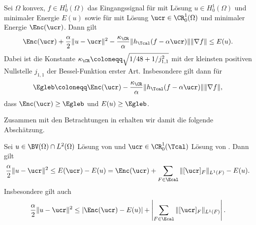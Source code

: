 
\begin{theorem}
  \label{thm:gueb}
  Sei $\Omega$ konvex, $f\in H^1_0(\Omega)$ das Eingangssignal für
   mit Lösung $u\in H^1_0(\Omega)$ und minimaler
  Energie $E(u)$ sowie für  mit Lösung $\ucr\in
  \CR^1_0(\Omega)$ und minimaler Energie $\Enc(\ucr)$.
  Dann gilt
  \begin{align*}
    \Enc(\ucr)+\frac{\alpha}{2}\Vert u-\ucr\Vert^2
    -\frac{\kappa_\CR}{\alpha}\Vert
    h_\Tcal(f-\alpha\ucr)\Vert \Vert\nabla f\Vert\leq E(u).
  \end{align*}
  Dabei ist die Konstante $\kappa_\CR\coloneqq\sqrt{1/48+1/j_{1,1}^2}$ mit der
  kleinsten positiven Nullstelle $j_{1,1}$ der Bessel-Funktion erster Art.
  Insbesondere gilt dann für 
  \begin{align}
    \Egleb 
    \coloneqq 
    \Enc(\ucr) - \frac{\kappa_\CR}{\alpha}\Vert h_\Tcal(f-\alpha\ucr)\Vert
    \Vert \nabla f\Vert,
  \end{align}
    dass $\Enc(\ucr)\geq \Egleb$ und $E(u)\geq \Egleb$.

\end{theorem}

Zusammen mit den Betrachtungen in  
erhalten wir damit die folgende Abschätzung.

\begin{corollary}
  Sei $u\in\BV(\Omega)\cap L^2(\Omega)$ Lösung von
   und $\ucr\in\CR^1_0(\Tcal)$ Lösung von
  .
  Dann gilt
  \begin{align*}
    \frac{\alpha}{2}\Vert u-\ucr\Vert^2\leq
    E(\ucr)-E(u)=\Enc(\ucr)+\sum_{F\in\Ecal}\Vert[\ucr]_F\Vert_{L^1(F)}-E(u).
  \end{align*}
  Insbesondere gilt auch 
  \begin{align*}
    \frac{\alpha}{2}\Vert u-\ucr\Vert^2
    \leq
    \left|\Enc(\ucr)-E(u)\right|+
    \left|\sum_{F\in\Ecal}\Vert[\ucr]_F\Vert_{L^1(F)}\right|.
  \end{align*}
\end{corollary}

